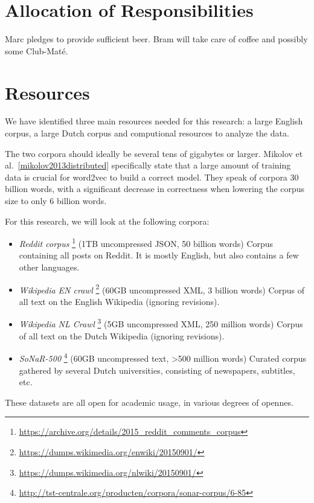 \section{Allocation of Responsibilities}
Marc pledges to provide sufficient beer. Bram will take care of coffee and possibly some Club-Maté.

\section{Resources}
We have identified three main resources needed for this research: a large English corpus, a large Dutch corpus and computional resources to analyze the data.

The two corpora should ideally be several tens of gigabytes or larger. Mikolov et al.~\ref{mikolov2013distributed} specifically state that a large amount of training data is crucial for word2vec to build a correct model. They speak of corpora 30 billion words, with a significant decrease in correctness when lowering the corpus size to only 6 billion words.

For this research, we will look at the following corpora:
\begin{itemize}
  \item \textit{Reddit corpus}
    \footnote{\url{https://archive.org/details/2015_reddit_comments_corpus}}
    (1TB uncompressed JSON, 50 billion words) Corpus containing all posts on Reddit. It is mostly English, but also contains a few other languages.
  \item \textit{Wikipedia EN crawl} 
    \footnote{\url{https://dumps.wikimedia.org/enwiki/20150901/}}
    (60GB uncompressed XML, 3 billion words) Corpus of all text on the English Wikipedia (ignoring revisions).
  \item \textit{Wikipedia NL Crawl} 
    \footnote{\url{https://dumps.wikimedia.org/nlwiki/20150901/}}
    (5GB uncompressed XML, 250 million words) Corpus of all text on the Dutch Wikipedia (ignoring revisions).
  \item \textit{SoNaR-500} 
    \footnote{\url{http://tst-centrale.org/producten/corpora/sonar-corpus/6-85}}
    (60GB uncompressed text, >500 million words) Curated corpus gathered by several Dutch universities, consisting of newspapers, subtitles, etc.
\end{itemize}

These datasets are all open for academic usage, in various degrees of opennes.